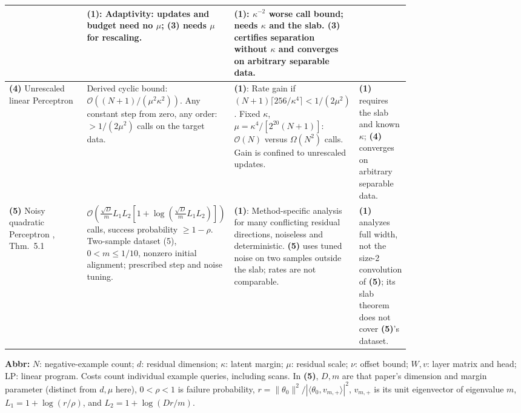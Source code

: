 \begin{table}[tp]
\begin{threeparttable}
\begin{tabularx}{\linewidth}{@{}>{\raggedright\arraybackslash}p{0.20\linewidth}>{\raggedright\arraybackslash}p{0.32\linewidth}>{\raggedright\arraybackslash}p{0.25\linewidth}>{\raggedright\arraybackslash}X@{}}
& \textbf{(1)}: Adaptivity: updates and budget need no $\mu$; \textbf{(3)} needs $\mu$ for rescaling.
& \textbf{(1)}: $\kappa^{-2}$ worse call bound; needs $\kappa$ and the slab. \textbf{(3)} certifies separation without $\kappa$ and converges on arbitrary separable data. \\
\midrule
\textbf{(4)} Unrescaled linear Perceptron \citep{cfwpNovikoff1963,cfwpLinearComparison}
& Derived cyclic bound: $\mathcal O((N+1)/(\mu^2\kappa^2))$. Any constant step from zero, any order: $>1/(2\mu^2)$ calls on the target data.
& \textbf{(1)}: Rate gain if $(N+1)\lceil256/\kappa^4\rceil<1/(2\mu^2)$. Fixed $\kappa$, $\mu=\kappa^4/[2^{20}(N+1)]$: $\mathcal O(N)$ versus $\Omega(N^2)$ calls. Gain is confined to unrescaled updates.
& \textbf{(1)} requires the slab and known $\kappa$; \textbf{(4)} converges on arbitrary separable data. \\
\midrule
\textbf{(5)} Noisy quadratic Perceptron \citep{tqpTyurin2026v2}, Thm.~5.1
& $\mathcal O\!\left(\frac{\sqrt D}{m}L_1L_2\left[1+\log\!\left(\frac{\sqrt D}{m}L_1L_2\right)\right]\right)$ calls, success probability $\ge1-\rho$. Two-sample dataset (5), $0<m\le1/10$, nonzero initial alignment; prescribed step and noise tuning.
& \textbf{(1)}: Method-specific analysis for many conflicting residual directions, noiseless and deterministic. \textbf{(5)} uses tuned noise on two samples outside the slab; rates are not comparable.
& \textbf{(1)} analyzes full width, not the size-2 convolution of \textbf{(5)}; its slab theorem does not cover \textbf{(5)}'s dataset. \\
\bottomrule
\end{tabularx}
\begin{tablenotes}[flushleft]\footnotesize
\item[] \textbf{Abbr:} $N$: negative-example count; $d$: residual dimension; $\kappa$: latent margin; $\mu$: residual scale; $\nu$: offset bound; $W,v$: layer matrix and head; LP: linear program. Costs count individual example queries, including scans. In \textbf{(5)}, $D,m$ are that paper's dimension and margin parameter (distinct from $d,\mu$ here), $0<\rho<1$ is failure probability, $r=\|\theta_0\|^2/|\langle\theta_0,v_{m,+}\rangle|^2$, $v_{m,+}$ is its unit eigenvector of eigenvalue $m$, $L_1=1+\log(r/\rho)$, and $L_2=1+\log(Dr/m)$.
\end{tablenotes}
\end{threeparttable}
\end{table}
